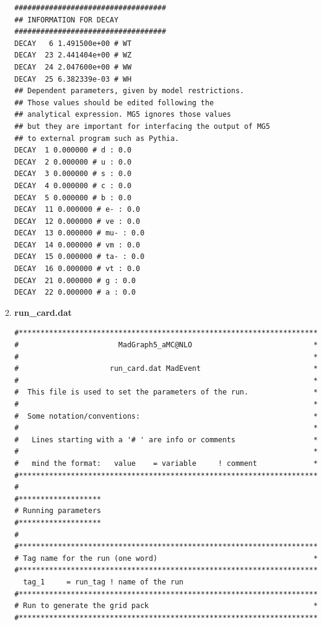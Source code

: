 \begin{enumerate}
\begin{lstlisting}
###################################
## INFORMATION FOR DECAY
###################################
DECAY   6 1.491500e+00 # WT 
DECAY  23 2.441404e+00 # WZ 
DECAY  24 2.047600e+00 # WW 
DECAY  25 6.382339e-03 # WH 
## Dependent parameters, given by model restrictions.
## Those values should be edited following the 
## analytical expression. MG5 ignores those values 
## but they are important for interfacing the output of MG5
## to external program such as Pythia.
DECAY  1 0.000000 # d : 0.0 
DECAY  2 0.000000 # u : 0.0 
DECAY  3 0.000000 # s : 0.0 
DECAY  4 0.000000 # c : 0.0 
DECAY  5 0.000000 # b : 0.0 
DECAY  11 0.000000 # e- : 0.0 
DECAY  12 0.000000 # ve : 0.0 
DECAY  13 0.000000 # mu- : 0.0 
DECAY  14 0.000000 # vm : 0.0 
DECAY  15 0.000000 # ta- : 0.0 
DECAY  16 0.000000 # vt : 0.0 
DECAY  21 0.000000 # g : 0.0 
DECAY  22 0.000000 # a : 0.0 
\end{lstlisting}
\item \textbf{run\_card.dat}
\begin{lstlisting}
#*********************************************************************
#                       MadGraph5_aMC@NLO                            *
#                                                                    *
#                     run_card.dat MadEvent                          *
#                                                                    *
#  This file is used to set the parameters of the run.               *
#                                                                    *
#  Some notation/conventions:                                        *
#                                                                    *
#   Lines starting with a '# ' are info or comments                  *
#                                                                    *
#   mind the format:   value    = variable     ! comment             *
#*********************************************************************
#
#*******************                                                 
# Running parameters
#*******************                                                 
#                                                                    
#*********************************************************************
# Tag name for the run (one word)                                    *
#*********************************************************************
  tag_1     = run_tag ! name of the run 
#*********************************************************************
# Run to generate the grid pack                                      *
#*********************************************************************

\end{lstlisting}
\end{enumerate}
